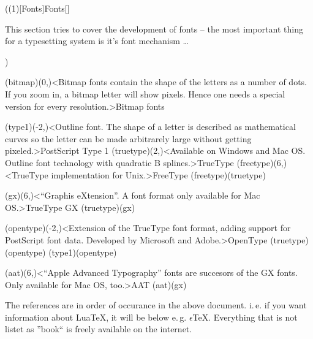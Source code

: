 \tograph(\tostruct(1)[Fonts]{Fonts}[\fonttechnology]
\parbox{\textwidth}{\large
This section tries to cover the development of fonts – the most important thing for a typesetting system is it's font mechanism …\\[4ex]}
){
	\tonode(bitmap)(0,\layer)<Bitmap fonts contain the shape of the letters as a number of dots. If you zoom in, a bitmap letter will show pixels. Hence one needs a special version for every resolution.>{Bitmap fonts}
	\steplayer[-3]

	\tonode(type1)(-2,\layer)<Outline font. The shape of a letter is described as mathematical curves so the letter can be made arbitrarely large without getting pixeled.>{PostScript Type 1}
	\tonode(truetype)(2,\layer)<Available on Windows and Mac OS. Outline font technology with quadratic B splines.>{TrueType}
	\tonode(freetype)(6,\layer)<TrueType implementation for Unix.>{FreeType}
	\todraw(freetype)(truetype)
	\steplayer[-3]

	\tonode(gx)(6,\layer)<“Graphis eXtension”. A font format only available for Mac OS.>{TrueType GX}
	\todraw(truetype)(gx)
	\steplayer[-3]

	\tonode(opentype)(-2,\layer)<Extension of the TrueType font format, adding support for PostScript font data. Developed by Microsoft and Adobe.>{OpenType}
	\todraw(truetype)(opentype)
	\todraw(type1)(opentype)

	\tonode(aat)(6,\layer)<“Apple Advanced Typography” fonts are succesors of the GX fonts. Only available for Mac OS, too.>{AAT}
	\todraw(aat)(gx)
}

\label{sec:text}

\large
{}

\settextviews  %
\onecolumn

\appendix
{}

\label{sec:refs}
\obeylines\flushleft  %

The references are in order of occurance in the above document. i.\,e. if you want information about Lua\TeX, it will be below e.\,g. $\epsilon$\TeX. Everything that is not listet as ”book“ is freely available on the internet.

